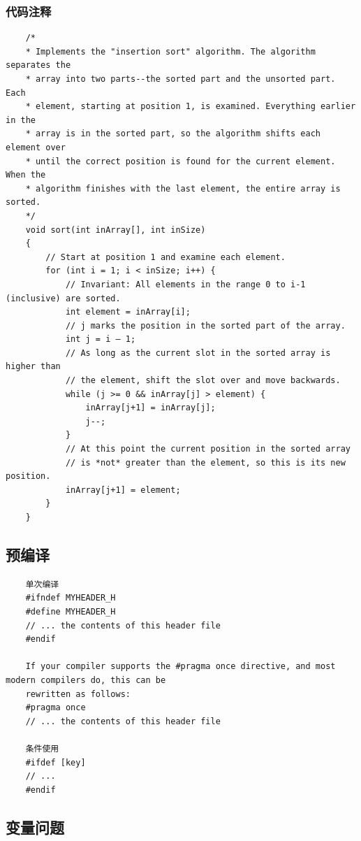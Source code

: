 \documentclass[UTF8,a4paper,12pt]{ctexbook} %
\begin{document}
			\subsubsection{代码注释}
			\begin{lstlisting}
	/*
	* Implements the "insertion sort" algorithm. The algorithm separates the
	* array into two parts--the sorted part and the unsorted part. Each
	* element, starting at position 1, is examined. Everything earlier in the
	* array is in the sorted part, so the algorithm shifts each element over
	* until the correct position is found for the current element. When the
	* algorithm finishes with the last element, the entire array is sorted.
	*/
	void sort(int inArray[], int inSize)
	{
		// Start at position 1 and examine each element.
		for (int i = 1; i < inSize; i++) {
			// Invariant: All elements in the range 0 to i-1 (inclusive) are sorted.
			int element = inArray[i];
			// j marks the position in the sorted part of the array.
			int j = i – 1;
			// As long as the current slot in the sorted array is higher than
			// the element, shift the slot over and move backwards.
			while (j >= 0 && inArray[j] > element) {
				inArray[j+1] = inArray[j];
				j--;
			}
			// At this point the current position in the sorted array
			// is *not* greater than the element, so this is its new position.
			inArray[j+1] = element;
		}
	}
			\end{lstlisting}
		\subsection{预编译}
			\begin{lstlisting}
	单次编译
	#ifndef MYHEADER_H
	#define MYHEADER_H
	// ... the contents of this header file
	#endif
	
	If your compiler supports the #pragma once directive, and most modern compilers do, this can be
	rewritten as follows:
	#pragma once
	// ... the contents of this header file
	
	条件使用
	#ifdef [key]
	// ...
	#endif
			\end{lstlisting}
				
		\subsection{变量问题}
\end{document}
